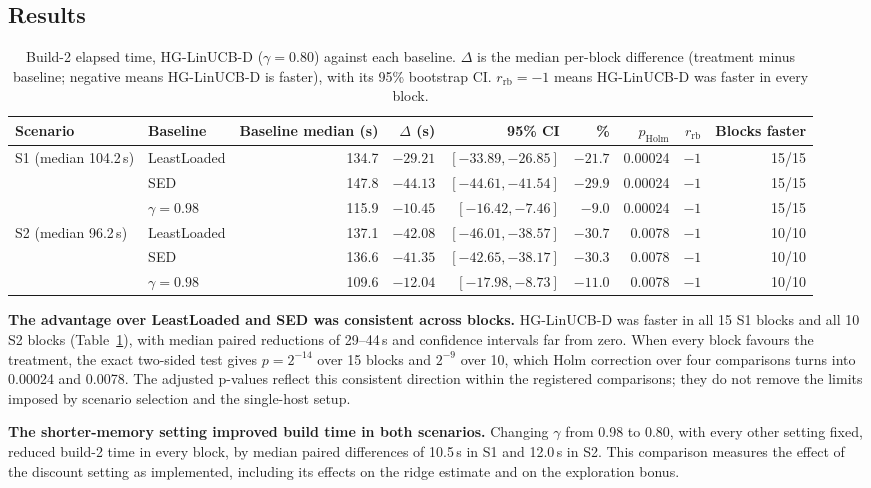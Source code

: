 \documentclass[final,5p,times,twocolumn]{elsarticle}
\begin{document}
\subsection{Results}
\label{sec:results}

\begin{table}[t]
\centering
\caption{Build-2 elapsed time, HG-LinUCB-D ($\gamma=0.80$) against each baseline. $\Delta$ is the median per-block difference (treatment minus baseline; negative means HG-LinUCB-D is faster), with its 95\% bootstrap CI. $r_{\text{rb}}=-1$ means HG-LinUCB-D was faster in every block.}
\label{tab:main}
\footnotesize
\begin{tabular}{llrrrrrrr}
\toprule
Scenario & Baseline & Baseline median (s) & $\Delta$ (s) & 95\% CI & \% & $p_{\text{Holm}}$ & $r_{\text{rb}}$ & Blocks faster \\
\midrule
S1 (median 104.2\,s) & LeastLoaded & 134.7 & $-29.21$ & $[-33.89, -26.85]$ & $-21.7$ & 0.00024 & $-1$ & 15/15 \\
 & SED & 147.8 & $-44.13$ & $[-44.61, -41.54]$ & $-29.9$ & 0.00024 & $-1$ & 15/15 \\
 & $\gamma=0.98$ & 115.9 & $-10.45$ & $[-16.42, -7.46]$ & $-9.0$ & 0.00024 & $-1$ & 15/15 \\
\midrule
S2 (median 96.2\,s) & LeastLoaded & 137.1 & $-42.08$ & $[-46.01, -38.57]$ & $-30.7$ & 0.0078 & $-1$ & 10/10 \\
 & SED & 136.6 & $-41.35$ & $[-42.65, -38.17]$ & $-30.3$ & 0.0078 & $-1$ & 10/10 \\
 & $\gamma=0.98$ & 109.6 & $-12.04$ & $[-17.98, -8.73]$ & $-11.0$ & 0.0078 & $-1$ & 10/10 \\
\bottomrule
\end{tabular}
\end{table}

\textbf{The advantage over LeastLoaded and SED was consistent across blocks.} HG-LinUCB-D was faster in all 15 S1 blocks and all 10 S2 blocks (Table~\ref{tab:main}), with median paired reductions of 29--44\,s and confidence intervals far from zero. When every block favours the treatment, the exact two-sided test gives $p=2^{-14}$ over 15 blocks and $2^{-9}$ over 10, which Holm correction over four comparisons turns into 0.00024 and 0.0078. The adjusted p-values reflect this consistent direction within the registered comparisons; they do not remove the limits imposed by scenario selection and the single-host setup.

\textbf{The shorter-memory setting improved build time in both scenarios.} Changing $\gamma$ from 0.98 to 0.80, with every other setting fixed, reduced build-2 time in every block, by median paired differences of 10.5\,s in S1 and 12.0\,s in S2. This comparison measures the effect of the discount setting as implemented, including its effects on the ridge estimate and on the exploration bonus.
\end{document}
